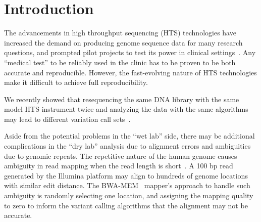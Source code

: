 \documentclass{bioinfo}
\newcommand{\junk}[1]{}
\begin{document}
\maketitle
\linenumbers
\section{Introduction}

The advancements in high throughput sequencing (HTS) technologies have increased the demand on producing genome sequence data for many research questions, and prompted pilot projects to test its
power in clinical settings~\citep{Biesecker2009}. Any ``medical test'' to be reliably used in the clinic has to be proven to be both accurate and reproducible.
However, the fast-evolving nature of HTS technologies make it difficult to achieve full reproducibility. %

We recently showed that 
resequencing the same DNA library 
with the same model HTS instrument 
twice 
and analyzing the data with the same algorithms 
may lead to different variation call sets~\citep{Kavak2015}. 
\junk{
There may be multiple reasons for this effect,
such as degradation of DNA between two sequencing experiments, signal processing and base calling errors during sequencing, or different GC biases introduced while making sequencing libraries from the
same DNA~\citep{Kavak2015}. 
}
Aside from the potential problems in the ``wet lab'' side,
there may be additional complications in the ``dry lab'' analysis due to alignment errors and ambiguities due to genomic repeats.
The repetitive nature of the  human genome causes ambiguity in read mapping when the read length is short~\citep{Treangen2012}. A 100 bp read generated by the Illumina platform may align to hundreds of genome locations with similar edit distance. 
The BWA-MEM~\citep{Li2013} mapper's  approach to handle such ambiguity is randomly selecting one location, and assigning the mapping quality to zero to inform the variant calling algorithms that the alignment may not be accurate. 
\end{document}

